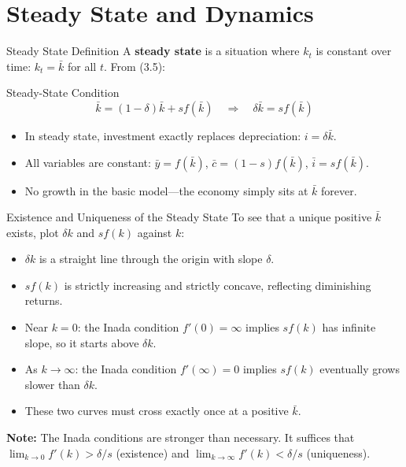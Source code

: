 \documentclass[aspectratio=169,10pt]{beamer}
\newcommand{\apxbutton}[1]{\hfill\hyperlink{#1}{\beamerbutton{Appendix}}}
\begin{document}
\section{Steady State and Dynamics}

\begin{frame}{Steady State Definition}
A \textbf{steady state} is a situation where $k_t$ is constant over time: $k_t = \bar{k}$ for all $t$. From (3.5):
\begin{block}{Steady-State Condition}
\[
\bar{k} = (1-\delta)\bar{k} + s f(\bar{k})
\quad\Longrightarrow\quad
\delta \bar{k} = s f(\bar{k})
\]
\end{block}
\begin{itemize}
  \item In steady state, investment exactly replaces depreciation: $i = \delta \bar{k}$.
  \item All variables are constant: $\bar{y} = f(\bar{k})$, $\bar{c} = (1-s)f(\bar{k})$, $\bar{i} = sf(\bar{k})$.
  \item No growth in the basic model---the economy simply sits at $\bar{k}$ forever.
\end{itemize}
\end{frame}

\begin{frame}{Existence and Uniqueness of the Steady State}
\hypertarget{m-a3}{}
To see that a unique positive $\bar{k}$ exists, plot $\delta k$ and $sf(k)$ against $k$:
\begin{itemize}
  \item $\delta k$ is a straight line through the origin with slope $\delta$.
  \item $sf(k)$ is strictly increasing and strictly concave, reflecting diminishing returns.
  \item Near $k=0$: the Inada condition $f'(0)=\infty$ implies $sf(k)$ has infinite slope, so it starts above $\delta k$.
  \item As $k\to\infty$: the Inada condition $f'(\infty)=0$ implies $sf(k)$ eventually grows slower than $\delta k$.
  \item These two curves must cross exactly once at a positive $\bar{k}$.
\end{itemize}

\medskip
\textbf{Note:} The Inada conditions are stronger than necessary. It suffices that $\lim_{k\to 0} f'(k) > \delta/s$ (existence) and $\lim_{k\to\infty} f'(k) < \delta/s$ (uniqueness).
\apxbutton{a3}
\end{frame}
\end{document}

